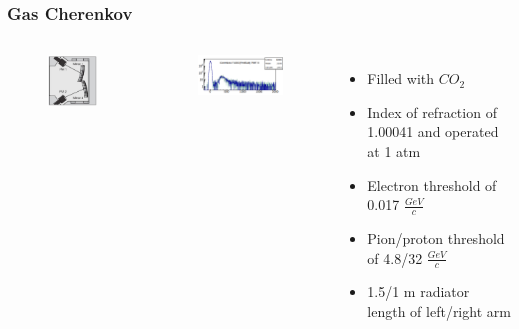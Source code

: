 \documentclass{beamer}
\begin{document}
\begin{frame}
\frametitle{Gas Cherenkov}

	\begin{columns}
		\begin{figure}
			\includegraphics[width=3cm]{../images/Cher}
		\end{figure}
		\begin{figure}
			\includegraphics[width=5cm]{../images/cher_1pmt}
		\end{figure}
		\begin{itemize}
			\item Filled with $CO_2$
			\item Index of refraction of 1.00041 and operated at 1 atm
			\item Electron threshold of 0.017 $\frac{GeV}{c}$
			\item Pion/proton threshold  of 4.8/32 $\frac{GeV}{c}$
			\item 1.5/1 m radiator length of left/right arm \cite{nim}
			

		\end{itemize}
	\end{columns}
\end{frame}
\end{document}
